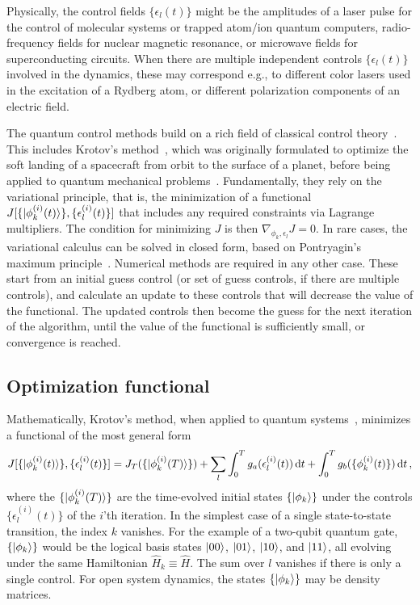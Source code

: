 \documentclass[submission, Phys]{SciPost}
\newcommand{\Op}[1]{\hat{#1}}
\newcommand{\dd}[0]{\,\text{d}}
\begin{document}
Physically, the control fields $\{\epsilon_l(t)\}$ might be the amplitudes of a
laser pulse for the control of molecular systems or trapped atom/ion quantum
computers, radio-frequency fields for nuclear magnetic resonance, or microwave
fields for superconducting circuits.
When there are multiple independent controls $\{\epsilon_l(t)\}$ involved in the
dynamics, these may correspond e.g., to different color lasers used in the
excitation of a Rydberg atom, or different polarization components of an
electric field.

The quantum control methods build on a rich field of classical control
theory~\cite{BellmanBook,PontryaginBook}.
This includes Krotov's
method~\cite{KrotovEC1983,KrotovCC1988,Krotov.book,KonnovARC99}, which was
originally formulated to optimize the soft landing of a spacecraft from orbit to
the surface of a planet, before being applied to quantum mechanical
problems~\cite{Tannor92,SomloiCP1993,BartanaJCP1997,SklarzPRA2002,ReichJCP12}.
Fundamentally, they rely on the variational principle, that is, the minimization
of a functional $J[\{\ket{\phi_k^{(i)}(t)}\}, \{\epsilon_l^{(i)}(t)\}]$ that
includes any required constraints via Lagrange multipliers.
The condition for minimizing $J$ is then $\nabla_{\phi_k, \epsilon_l} J = 0$.
In rare cases, the variational calculus can be solved in closed form, based on
Pontryagin's maximum principle~\cite{PontryaginBook}.
Numerical methods are required in any other case.
These start from an initial guess control (or set of guess controls, if there
are multiple controls), and calculate an update to these controls that will
decrease the value of the functional.
The updated controls then become the guess for the next iteration of the
algorithm, until the value of the functional is sufficiently small, or
convergence is reached.

\subsection{Optimization functional}%
\label{sec:overview_functional}

Mathematically, Krotov's method, when applied to quantum
systems~\cite{Tannor92,ReichJCP12}, minimizes a functional of the most general
form
\begin{equation}
  \label{eq:functional}
  J[\{\ket{\phi_k^{(i)}(t)}\}, \{\epsilon_l^{(i)}(t)\}]
    = J_T(\{\ket{\phi_k^{(i)}(T)}\})
        + \sum_l \int_0^T g_a(\epsilon_l^{(i)}(t)) \dd t
        + \int_0^T g_b(\{\phi^{(i)}_k(t)\}) \dd t\,,
\end{equation}
where the \(\{\ket{\phi_k^{(i)}(T)}\}\) are the time-evolved initial states
\(\{\ket{\phi_k}\}\) under the controls \(\{\epsilon^{(i)}_l(t)\}\) of the
$i$'th iteration.
In the simplest case of a single state-to-state transition, the index $k$
vanishes.
For the example of a two-qubit quantum gate, \(\{\ket{\phi_k}\}\) would be the
logical basis states $\ket{00}$, $\ket{01}$, $\ket{10}$, and $\ket{11}$, all
evolving under the same Hamiltonian $\Op{H}_k \equiv \Op{H}$.
The sum over $l$ vanishes if there is only a single control.
For open system dynamics, the states \(\{\ket{\phi_k}\}\) may be density
matrices.
\end{document}
